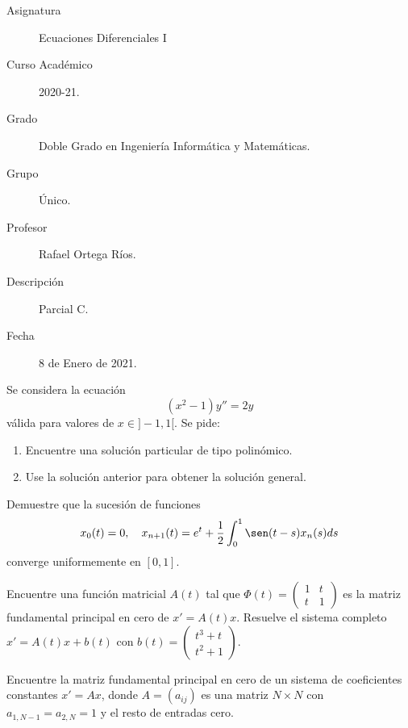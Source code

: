 \documentclass[12pt]{article}
\begin{document}

    
    

    \begin{description}
        \item[Asignatura] Ecuaciones Diferenciales I
        \item[Curso Académico] 2020-21.
        \item[Grado] Doble Grado en Ingeniería Informática y Matemáticas.
        \item[Grupo] Único.
        \item[Profesor] Rafael Ortega Ríos.
        \item[Descripción] Parcial C.
        \item[Fecha] 8 de Enero de 2021.
    \end{description}
    \newpage

    \begin{ejercicio}
    Se considera la ecuación
    \[
        (x^2 - 1)y'' = 2y
    \]
    válida para valores de $x \in ]-1, 1[$. Se pide:
    \begin{enumerate}
        \item Encuentre una solución particular de tipo polinómico.
        \item Use la solución anterior para obtener la solución general.
    \end{enumerate}
    \end{ejercicio}

    \begin{ejercicio}
    Demuestre que la sucesión de funciones
    \[
        x_0(t) = 0, \quad x_{n+1}(t) = e^t + \frac{1}{2} \int_0^1 \sen(t - s)x_n(s)ds
    \]
    converge uniformemente en $[0, 1]$.
    \end{ejercicio}

    \begin{ejercicio}
    Encuentre una función matricial $A(t)$ tal que $\Phi(t) = \begin{pmatrix} 1 & t \\ t & 1 \end{pmatrix}$ es la matriz fundamental principal en cero de $x' = A(t)x$. Resuelve el sistema completo $x' = A(t)x + b(t)$ con $b(t) = \begin{pmatrix} t^3 + t \\ t^2 + 1 \end{pmatrix}$.
    \end{ejercicio}

    \begin{ejercicio}
    Encuentre la matriz fundamental principal en cero de un sistema de coeficientes constantes $x' = Ax$, donde $A = (a_{ij})$ es una matriz $N \times N$ con $a_{1,N-1} = a_{2,N} = 1$ y el resto de entradas cero.
    \end{ejercicio}
\end{document}
